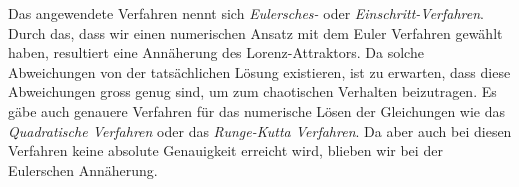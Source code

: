Das angewendete Verfahren nennt sich \textit{Eulersches-} oder \textit{Einschritt-Verfahren}. Durch das, dass wir einen numerischen Ansatz mit dem Euler Verfahren gewählt haben, resultiert eine Annäherung des Lorenz-Attraktors. Da solche Abweichungen von der tatsächlichen Lösung existieren, ist zu erwarten, dass diese Abweichungen gross genug sind, um zum chaotischen Verhalten beizutragen. Es gäbe auch genauere Verfahren für das numerische Lösen der Gleichungen wie das \textit{Quadratische Verfahren} oder das \textit{Runge-Kutta Verfahren}. Da aber auch bei diesen Verfahren keine absolute Genauigkeit erreicht wird, blieben wir bei der Eulerschen Annäherung. 
